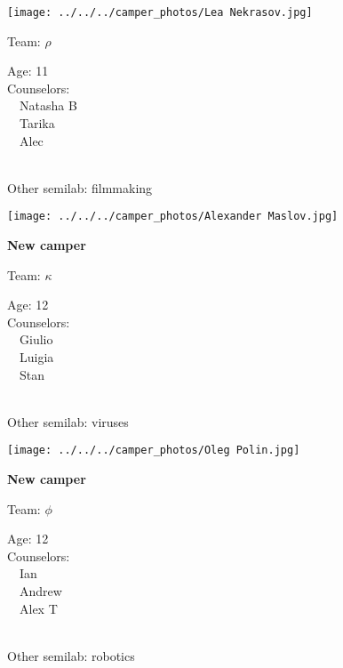 \documentclass[10pt,letterpaper, landscape]{article}
\begin{document}
\horizontalshiftfornextsticker
\renewcommand{\baselinestretch}{1} \begin{sticker}
\noindent\begin{minipage}{0.5\textwidth}\texttt{[image: ../../../camper\_photos/Lea Nekrasov.jpg]}\end{minipage}\begin{minipage}{0.45\textwidth}
Team: {\Large $\rho$}

Age:        11\\
Counselors: \\\ \ Natasha B\\\ \ Tarika\\\ \ Alec\\
\end{minipage} \\ \vspace{0.07in}
Other semilab: filmmaking
\end{sticker}
\verticalshiftfornextsticker
\renewcommand{\baselinestretch}{1} \begin{sticker}
\noindent\begin{minipage}{0.5\textwidth}\texttt{[image: ../../../camper\_photos/Alexander Maslov.jpg]}\end{minipage}\begin{minipage}{0.45\textwidth}
\textbf{New camper} 

Team: {\Large $\kappa$}

Age:        12\\
Counselors: \\\ \ Giulio\\\ \ Luigia\\\ \ Stan\\
\end{minipage} \\ \vspace{0.07in}
Other semilab: viruses
\end{sticker}
\horizontalshiftfornextsticker
\renewcommand{\baselinestretch}{1} \begin{sticker}
\noindent\begin{minipage}{0.5\textwidth}\texttt{[image: ../../../camper\_photos/Oleg Polin.jpg]}\end{minipage}\begin{minipage}{0.45\textwidth}
\textbf{New camper} 

Team: {\Large $\phi$}

Age:        12\\
Counselors: \\\ \ Ian\\\ \ Andrew\\\ \ Alex T\\
\end{minipage} \\ \vspace{0.07in}
Other semilab: robotics
\end{sticker}
\end{document}
